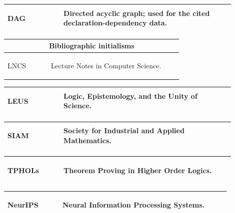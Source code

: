 \documentclass[11pt,reqno]{amsart}
\theoremstyle{blueplain}
\numberwithin{equation}{section}
\def\hyperlink#1#2{#2}}
\begin{document}
\noindent
\begin{tabular}{|@{}p{0.22500\linewidth}|p{0.67500\linewidth}|}\hline
\hypertarget{abbr:DAG}{}\hyperlink{abbr-source:MathlibGraph}{\textsf{DAG}} & Directed acyclic graph; used for the cited declaration-dependency data.\\\hline
\end{tabular}%
\par\setlength{\parskip}{0pt}\nointerlineskip
\noindent
\begin{tabular}{|@{}p{0.22500\linewidth}|p{0.67500\linewidth}|}\hline
\multicolumn{2}{|c|}{\textbf{Bibliographic initialisms}}\\\hline
\hypertarget{abbr:LNCS}{}\hyperlink{abbr-source:OConnor2008}{\textsf{LNCS}} & Lecture Notes in Computer Science.\\\hline
\end{tabular}%
\par\setlength{\parskip}{0pt}\nointerlineskip
\noindent
\begin{tabular}{|@{}p{0.22500\linewidth}|p{0.67500\linewidth}|}\hline
\hypertarget{abbr:LEUS}{}\hyperlink{abbr-source:Tait2012}{\textsf{LEUS}} & Logic, Epistemology, and the Unity of Science.\\\hline
\end{tabular}%
\par\setlength{\parskip}{0pt}\nointerlineskip
\noindent
\begin{tabular}{|@{}p{0.22500\linewidth}|p{0.67500\linewidth}|}\hline
\hypertarget{abbr:SIAM}{}\hyperlink{abbr-source:Pratt1975}{\textsf{SIAM}} & Society for Industrial and Applied Mathematics.\\\hline
\end{tabular}%
\par\setlength{\parskip}{0pt}\nointerlineskip
\noindent
\begin{tabular}{|@{}p{0.22500\linewidth}|p{0.67500\linewidth}|}\hline
\hypertarget{abbr:TPHOLs}{}\hyperlink{abbr-source:OConnor2008}{\textsf{TPHOLs}} & Theorem Proving in Higher Order Logics.\\\hline
\end{tabular}%
\par\setlength{\parskip}{0pt}\nointerlineskip
\noindent
\begin{tabular}{|@{}p{0.22500\linewidth}|p{0.67500\linewidth}|}\hline
\hypertarget{abbr:NeurIPS}{}\hyperlink{abbr-source:MathlibGraph}{\textsf{NeurIPS}} & Neural Information Processing Systems.\\\hline
\end{tabular}%
\end{document}
